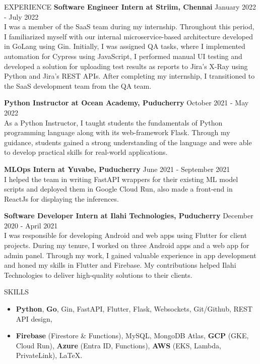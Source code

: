 \documentclass{template}
\begin{document}
\begin{rSection}{EXPERIENCE}
\textbf{Software Engineer Intern at Striim, Chennai} \hfill January 2022 - July 2022 \\
I was a member of the SaaS team during my internship. Throughout this period, I familiarized myself with our internal microservice-based architecture developed in GoLang using Gin. Initially, I was assigned QA tasks, where I implemented automation for Cypress using JavaScript, I performed manual UI testing and developed a solution for uploading test results as reports to Jira's X-Ray using Python and Jira's REST APIs. After completing my internship, I transitioned to the SaaS development team from the QA team. 

\textbf{Python Instructor at Ocean Academy, Puducherry} \hfill October 2021 - May 2022 \\
As a Python Instructor, I taught students the fundamentals of Python programming language along with its web-framework Flask. Through my guidance, students gained a strong understanding of the language and were able to develop practical skills for real-world applications.

\textbf{MLOps Intern at Yuvabe, Puducherry} \hfill June 2021 - September 2021 \\
I helped the team in writing FastAPI wrappers for their existing ML model scripts and deployed them in Google Cloud Run, also made a front-end in ReactJs for displaying the inferences.

\textbf{Software Developer Intern at Ilahi Technologies, Puducherry} \hfill December 2020 - April 2021 \\
I was responsible for developing Android and web apps using Flutter for client projects. During my tenure, I worked on three Android apps and a web app for admin panel. Through my work, I gained valuable experience in app development and honed my skills in Flutter and Firebase. My contributions helped Ilahi Technologies to deliver high-quality solutions to their clients.

\end{rSection} 

\begin{rSection}{SKILLS}
\begin{itemize}
    \item \textbf{Python}, \textbf{Go}, Gin, FastAPI, Flutter, Flask, Websockets, Git/Github, REST API design, 

    \item \textbf{Firebase} (Firestore \& Functions), MySQL, MongoDB Atlas, \textbf{GCP} (GKE, Cloud Run), \textbf{Azure} (Entra ID, Functions), \textbf{AWS} (EKS, Lambda, PrivateLink), \LaTeX.
\end{itemize}

\end{rSection}
\end{document}
